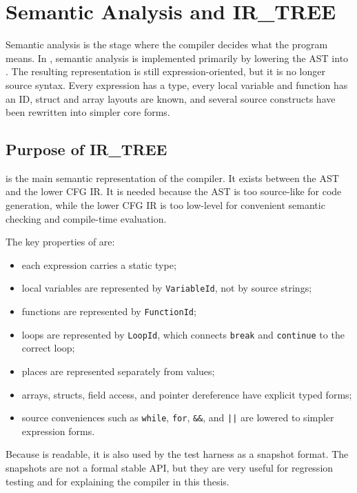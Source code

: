 \chapter{Semantic Analysis and IR\_TREE}
\label{chap:semantic}

Semantic analysis is the stage where the compiler decides what the program
means. In \epl{}, semantic analysis is implemented primarily by lowering the AST
into \irtree{}. The resulting representation is still expression-oriented, but it
is no longer source syntax. Every expression has a type, every local variable and
function has an ID, struct and array layouts are known, and several source
constructs have been rewritten into simpler core forms.

\section{Purpose of IR\_TREE}

\irtree{} is the main semantic representation of the compiler. It exists between
the AST and the lower CFG IR. It is needed because the AST is too source-like for
code generation, while the lower CFG IR is too low-level for convenient semantic
checking and compile-time evaluation.

The key properties of \irtree{} are:

\begin{itemize}
  \item each expression carries a static type;
  \item local variables are represented by \texttt{VariableId}, not by source
        strings;
  \item functions are represented by \texttt{FunctionId};
  \item loops are represented by \texttt{LoopId}, which connects
        \texttt{break} and \texttt{continue} to the correct loop;
  \item places are represented separately from values;
  \item arrays, structs, field access, and pointer dereference have explicit
        typed forms;
  \item source conveniences such as \texttt{while}, \texttt{for}, \texttt{\&\&},
        and \texttt{||} are lowered to simpler expression forms.
\end{itemize}

Because \irtree{} is readable, it is also used by the test harness as a snapshot
format. The snapshots are not a formal stable API, but they are very useful for
regression testing and for explaining the compiler in this thesis.

